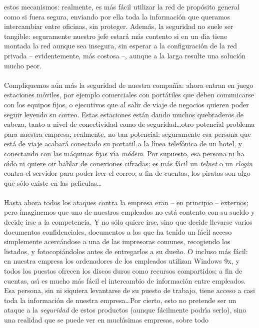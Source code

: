 estos mecanismos: realmente, es m\'as f\'acil utilizar la red de prop\'osito
general como si fuera segura, enviando por ella toda la informaci\'on que 
queramos intercambiar entre oficinas, sin proteger. Adem\'as, la seguridad no
suele ser tangible: seguramente nuestro jefe estar\'a m\'as contento si en un
d\'{\i}a tiene montada la red aunque sea insegura, sin esperar a la 
configuraci\'on de la red privada -- evidentemente, m\'as costosa --, aunque a 
la larga resulte una soluci\'on mucho peor.\\
\\Compliquemos a\'un m\'as la seguridad de nuestra compa\~n\'{\i}a: ahora entran
en juego estaciones m\'oviles, por ejemplo comerciales con port\'atiles que
deben comunicarse con los equipos fijos, o ejecutivos que al salir de viaje
de negocios quieren poder seguir leyendo su correo. Estas estaciones est\'an 
dando muchos quebraderos de cabeza, tanto a nivel de conectividad como de 
seguridad\ldots otro potencial problema para nuestra empresa; realmente, no tan
potencial: seguramente esa persona que est\'a de viaje acabar\'a conectado su
portatil a la l\'{\i}nea telef\'onica de un hotel, y conectando con las 
m\'aquinas fijas v\'{\i}a {\it m\'odem}. Por supuesto, esa persona ni ha 
o\'{\i}do ni quiere oir hablar de conexiones cifradas: es m\'as f\'acil un {\it 
telnet} o un {\it rlogin} contra el servidor para poder leer el correo; a fin
de cuentas, los piratas son algo que s\'olo existe en las pel\'{\i}culas\ldots\\
\\Hasta ahora todos los ataques contra la empresa eran -- en principio -- 
externos; pero imaginemos que uno de nuestros empleados no est\'a contento con
su sueldo y decide irse a la competencia. Y no s\'olo quiere irse, sino que
decide llevarse varios documentos confidenciales, documentos a los que ha tenido
un f\'acil acceso simplemente acerc\'andose a una de las impresoras comunes,
recogiendo los listados, y fotocopi\'andolos antes de entregarlos a su due\~no.
O incluso m\'as f\'acil: en nuestra empresa
los ordenadores de los empleados utilizan Windows 9x, y todos los puestos
ofrecen los discos duros como recursos compartidos; a fin de cuentas, as\'{\i}
es mucho m\'as f\'acil el intercambio de informaci\'on entre empleados. Esa
persona, sin ni siquiera levantarse de su puesto de trabajo, tiene acceso a casi
toda la informaci\'on de nuestra empresa\ldots Por cierto, esto no pretende ser
un ataque a la {\it seguridad} de estos productos (aunque f\'acilmente 
podr\'{\i}a serlo),
sino una realidad que se puede ver en much\'{\i}simas empresas, sobre todo 
